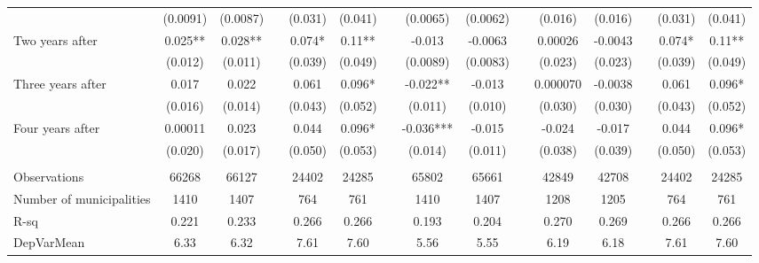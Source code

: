 \begin{tabular}{lcccccccccccccc}
      & (0.0091) & (0.0087) &       & (0.031) & (0.041) &       & (0.0065) & (0.0062) &       & (0.016) & (0.016) &       & (0.031) & (0.041) \\
Two years after & 0.025** & 0.028** &       & 0.074* & 0.11** &       & -0.013 & -0.0063 &       & 0.00026 & -0.0043 &       & 0.074* & 0.11** \\
      & (0.012) & (0.011) &       & (0.039) & (0.049) &       & (0.0089) & (0.0083) &       & (0.023) & (0.023) &       & (0.039) & (0.049) \\
Three years after & 0.017 & 0.022 &       & 0.061 & 0.096* &       & -0.022** & -0.013 &       & 0.000070 & -0.0038 &       & 0.061 & 0.096* \\
      & (0.016) & (0.014) &       & (0.043) & (0.052) &       & (0.011) & (0.010) &       & (0.030) & (0.030) &       & (0.043) & (0.052) \\
Four years after & 0.00011 & 0.023 &       & 0.044 & 0.096* &       & -0.036*** & -0.015 &       & -0.024 & -0.017 &       & 0.044 & 0.096* \\
      & (0.020) & (0.017) &       & (0.050) & (0.053) &       & (0.014) & (0.011) &       & (0.038) & (0.039) &       & (0.050) & (0.053) \\
      &       &       &       &       &       &       &       &       &       &       &       &       &       &  \\
\midrule
Observations & 66268 & 66127 &       & 24402 & 24285 &       & 65802 & 65661 &       & 42849 & 42708 &       & 24402 & 24285 \\
Number of municipalities & 1410  & 1407  &       & 764   & 761   &       & 1410  & 1407  &       & 1208  & 1205  &       & 764   & 761 \\
R-sq  & 0.221 & 0.233 &       & 0.266 & 0.266 &       & 0.193 & 0.204 &       & 0.270 & 0.269 &       & 0.266 & 0.266 \\
DepVarMean & 6.33  & 6.32  &       & 7.61  & 7.60  &       & 5.56  & 5.55  &       & 6.19  & 6.18  &       & 7.61  & 7.60 \\
\bottomrule
\bottomrule
\end{tabular}%
